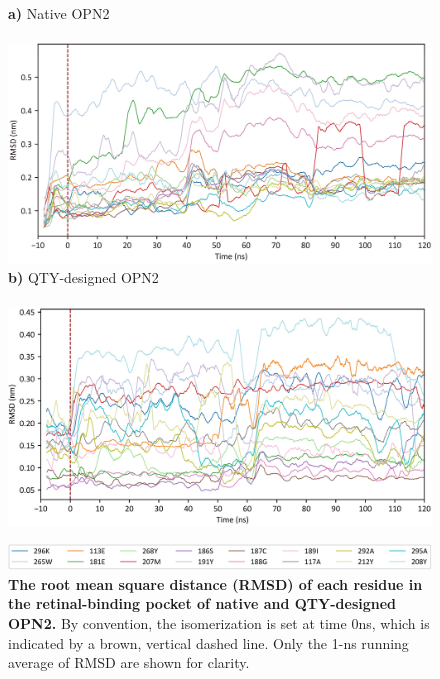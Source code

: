 \documentclass[fleqn,12pt]{supp}
\begin{document}
\begin{figure}[H]
    \caption{\textbf{The root mean square distance (RMSD) of each residue in the retinal-binding pocket of native and QTY-designed OPN2. } By convention, the isomerization is set at time 0ns, which is indicated by a brown, vertical dashed line. Only the 1-ns running average of RMSD are shown for clarity. }
    \textbf{a)} Native OPN2 \\ \\
    \includegraphics[width=\linewidth]{FigureS5a.jpg}
    \textbf{b)} QTY-designed OPN2 \\ \\
    \includegraphics[width=\linewidth]{FigureS5b.jpg}
    
    \vspace{0.5cm}
    \includegraphics[width=\linewidth]{FigureS5legend.jpg}
\end{figure}
\end{document}

